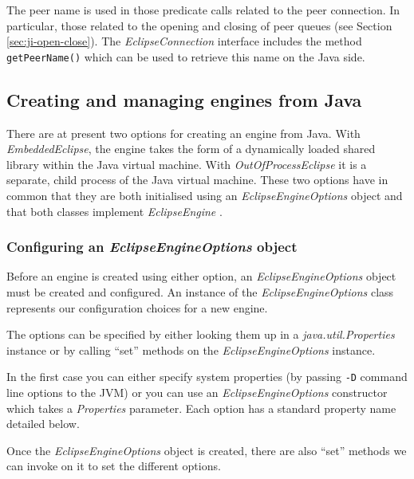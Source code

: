 The peer name is used in those {\eclipse} predicate calls related to the
peer connection. In particular, those related to the opening and closing of
peer queues (see Section \ref{sec:ji-open-close}). The {\it
EclipseConnection}  interface includes
the method {\tt getPeerName()} which can be used to retrieve this name on
the Java side.

\subsection{Creating and managing {\eclipse} engines from Java}
\label{sec:ji-creating-eclipse-engines}

There are at present two options for creating an {\eclipse} engine from
Java. With {\it EmbeddedEclipse}, the engine
takes the form of a dynamically loaded shared library within the Java
virtual machine. With {\it OutOfProcessEclipse} it is a separate, child
process of the Java virtual machine. These two options have in common that
they are both initialised using an {\it EclipseEngineOptions} object and
that both classes implement {\it EclipseEngine} .

\subsubsection{Configuring an {\it EclipseEngineOptions} object}
\label{sec:ji-eclipse-engine-options}
Before an {\eclipse} engine is created using either option, an {\it
EclipseEngineOptions} object must be created and configured. An
instance of the {\it EclipseEngineOptions} class represents our
configuration choices for a new {\eclipse} engine. 

The options can be specified by either looking them up in a {\it
java.util.Properties} instance or by calling ``set'' methods on the
{\it EclipseEngineOptions} instance.

In the first case you can either specify system properties (by passing
{\tt -D} command line options to the JVM) or you can use an {\it
EclipseEngineOptions} constructor which takes a {\it Properties}
parameter. Each option has a standard property name detailed below.

Once the {\it EclipseEngineOptions} object is created, there are
also ``set'' methods we can invoke on it to set the different options.

